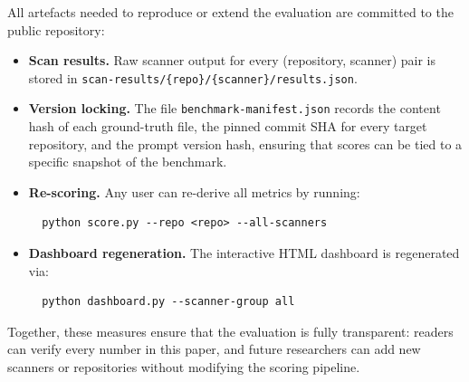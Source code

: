 All artefacts needed to reproduce or extend the evaluation are committed
to the public repository:

\begin{itemize}
  \item \textbf{Scan results.} Raw scanner output for every
    (repository, scanner) pair is stored in
    \texttt{scan-results/\{repo\}/\{scanner\}/results.json}.
  \item \textbf{Version locking.} The file
    \texttt{benchmark-manifest.json} records the content hash of each
    ground-truth file, the pinned commit SHA for every target
    repository, and the prompt version hash, ensuring that scores can be
    tied to a specific snapshot of the benchmark.
  \item \textbf{Re-scoring.} Any user can re-derive all metrics by
    running:
    \begin{verbatim}
  python score.py --repo <repo> --all-scanners
    \end{verbatim}
  \item \textbf{Dashboard regeneration.} The interactive HTML dashboard
    is regenerated via:
    \begin{verbatim}
  python dashboard.py --scanner-group all
    \end{verbatim}
\end{itemize}

\noindent
Together, these measures ensure that the evaluation is fully
transparent: readers can verify every number in this paper, and future
researchers can add new scanners or repositories without modifying the
scoring pipeline.
